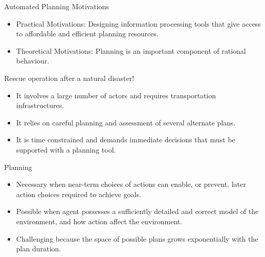 \documentclass[9pt]{beamer}
\begin{document}
\begin{frame}{Automated Planning Motivations}
\begin{small}

\begin{itemize}
\item \textcolor{CS-1light}{Practical Motivations}: Designing information processing tools that give access to affordable and efficient planning resources.
\item \textcolor{CS-1light}{Theoretical Motivations}: Planning is an important component of
rational behaviour.
\end{itemize}

\pause

\begin{exampleblock}{Rescue operation after a natural disaster!}
\begin{itemize}
\item It involves a large number of actors and requires transportation infrastructures.
\item It relies on careful planning and assessment of several alternate plans.
\item It is time constrained and demands immediate decisions that must be supported with a planning tool.
\end{itemize}
\end{exampleblock}

\end{small}
\end{frame}

\begin{frame}{Planning}
\begin{small}

\begin{itemize}
\item Necessary when \textcolor{CS-1light}{near-term} choices of actions can enable, or prevent, later action choices required to achieve goals.
\item Possible when agent possesses a \textcolor{CS-1light}{sufficiently detailed and correct model} of the environment, and how action affect the environment.
\item Challenging because the space of possible plans \textcolor{CS-1light}{grows exponentially} with the plan duration.
\end{itemize}

\end{small}
\end{frame}
\end{document}
